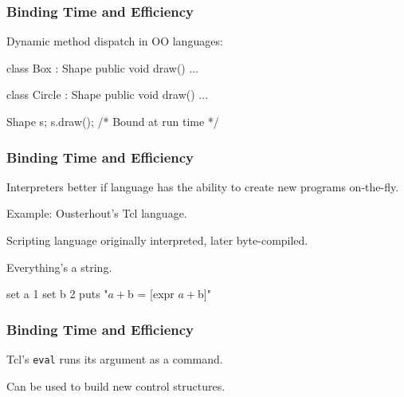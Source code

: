 \documentclass{plt}
\begin{document}
\begin{frame}[fragile]
  \frametitle{Binding Time and Efficiency}

Dynamic method dispatch in OO languages:

\begin{C++}
class Box : Shape {
  public void draw() { ... }
}

class Circle : Shape {
  public void draw() { ... }
}

Shape s;
s.draw();  /* Bound at run time */
\end{C++}


\end{frame}



\begin{frame}[fragile]
  \frametitle{Binding Time and Efficiency}

Interpreters better if language has the ability to create new programs
on-the-fly.

Example: Ousterhout's Tcl language.

Scripting language originally interpreted, later byte-compiled.

Everything's a string.

\begin{tcl}
set a 1
set b 2
puts "$a + $b = [expr $a + $b]"
\end{tcl}

\end{frame}



\begin{frame}[fragile]
  \frametitle{Binding Time and Efficiency}

Tcl's \texttt{eval} runs its argument as a command.

Can be used to build new control structures.


\end{frame}
\end{document}
